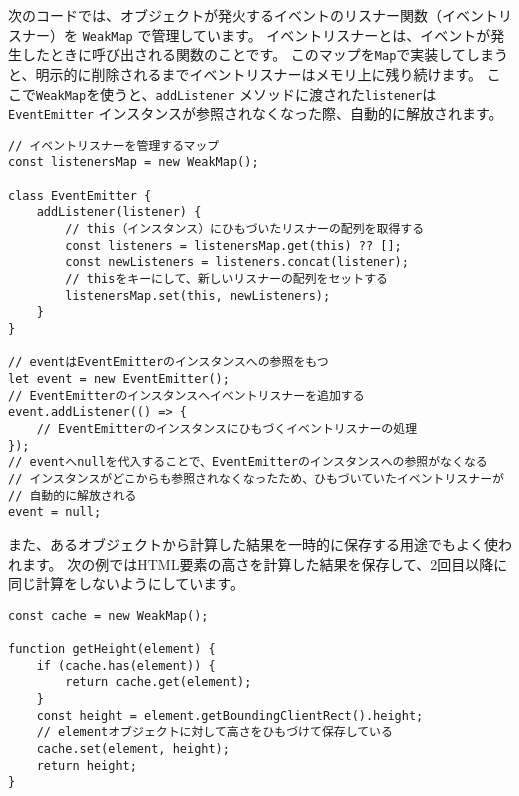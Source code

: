 次のコードでは、オブジェクトが発火するイベントのリスナー関数（イベントリスナー）を
\texttt{WeakMap} で管理しています。
イベントリスナーとは、イベントが発生したときに呼び出される関数のことです。
このマップを\texttt{Map}で実装してしまうと、明示的に削除されるまでイベントリスナーはメモリ上に残り続けます。
ここで\texttt{WeakMap}を使うと、\texttt{addListener}
メソッドに渡された\texttt{listener}は
\texttt{EventEmitter}
インスタンスが参照されなくなった際、自動的に解放されます。
\newpage
\begin{lstlisting}
// イベントリスナーを管理するマップ
const listenersMap = new WeakMap();

class EventEmitter {
    addListener(listener) {
        // this（インスタンス）にひもづいたリスナーの配列を取得する
        const listeners = listenersMap.get(this) ?? [];
        const newListeners = listeners.concat(listener);
        // thisをキーにして、新しいリスナーの配列をセットする
        listenersMap.set(this, newListeners);
    }
}

// eventはEventEmitterのインスタンスへの参照をもつ
let event = new EventEmitter();
// EventEmitterのインスタンスへイベントリスナーを追加する
event.addListener(() => {
    // EventEmitterのインスタンスにひもづくイベントリスナーの処理
});
// eventへnullを代入することで、EventEmitterのインスタンスへの参照がなくなる
// インスタンスがどこからも参照されなくなったため、ひもづいていたイベントリスナーが
// 自動的に解放される
event = null;
\end{lstlisting}

また、あるオブジェクトから計算した結果を一時的に保存する用途でもよく使われます。
次の例ではHTML要素の高さを計算した結果を保存して、2回目以降に同じ計算をしないようにしています。

\begin{lstlisting}
const cache = new WeakMap();

function getHeight(element) {
    if (cache.has(element)) {
        return cache.get(element);
    }
    const height = element.getBoundingClientRect().height;
    // elementオブジェクトに対して高さをひもづけて保存している
    cache.set(element, height);
    return height;
}
\end{lstlisting}

